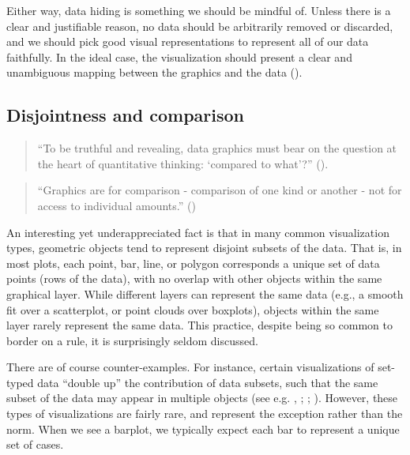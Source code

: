 \documentclass[
]{book}
\theoremstyle{definition}
\theoremstyle{definition}
\theoremstyle{definition}
\theoremstyle{definition}
\theoremstyle{remark}
\begin{document}
Either way, data hiding is something we should be mindful of. Unless there is a clear and justifiable reason, no data should be arbitrarily removed or discarded, and we should pick good visual representations to represent all of our data faithfully. In the ideal case, the visualization should present a clear and unambiguous mapping between the graphics and the data ().

\subsection{Disjointness and comparison}\label{disjointness-and-comparison}

\begin{quote}
``To be truthful and revealing, data graphics must bear on the question at the heart of quantitative thinking: `compared to what'?'' ().
\end{quote}

\begin{quote}
``Graphics are for comparison - comparison of one kind or another - not for access to individual amounts.'' ()
\end{quote}

An interesting yet underappreciated fact is that in many common visualization types, geometric objects tend to represent disjoint subsets of the data. That is, in most plots, each point, bar, line, or polygon corresponds a unique set of data points (rows of the data), with no overlap with other objects within the same graphical layer. While different layers can represent the same data (e.g., a smooth fit over a scatterplot, or point clouds over boxplots), objects within the same layer rarely represent the same data. This practice, despite being so common to border on a rule, it is surprisingly seldom discussed.

There are of course counter-examples. For instance, certain visualizations of set-typed data ``double up'' the contribution of data subsets, such that the same subset of the data may appear in multiple objects (see e.g. , ; ; ). However, these types of visualizations are fairly rare, and represent the exception rather than the norm. When we see a barplot, we typically expect each bar to represent a unique set of cases.
\end{document}
